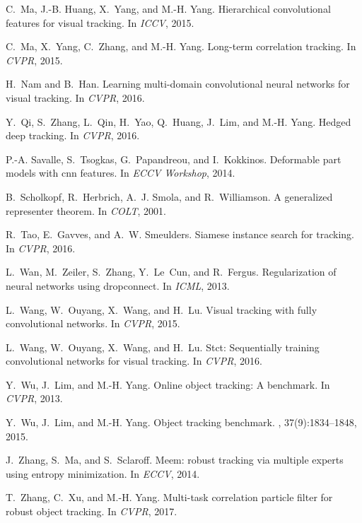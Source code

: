\documentclass[10pt,twocolumn,letterpaper]{article}
\begin{document}
{\begin{thebibliography}{10}
C.~Ma, J.-B. Huang, X.~Yang, and M.-H. Yang.
\newblock Hierarchical convolutional features for visual tracking.
\newblock In {\em ICCV}, 2015.

C.~Ma, X.~Yang, C.~Zhang, and M.-H. Yang.
\newblock Long-term correlation tracking.
\newblock In {\em CVPR}, 2015.

H.~Nam and B.~Han.
\newblock Learning multi-domain convolutional neural networks for visual
  tracking.
\newblock In {\em CVPR}, 2016.

Y.~Qi, S.~Zhang, L.~Qin, H.~Yao, Q.~Huang, J.~Lim, and M.-H. Yang.
\newblock Hedged deep tracking.
\newblock In {\em CVPR}, 2016.

P.-A. Savalle, S.~Tsogkas, G.~Papandreou, and I.~Kokkinos.
\newblock Deformable part models with cnn features.
\newblock In {\em ECCV Workshop}, 2014.

B.~Scholkopf, R.~Herbrich, A.~J. Smola, and R.~Williamson.
\newblock A generalized representer theorem.
\newblock In {\em COLT}, 2001.

R.~Tao, E.~Gavves, and A.~W. Smeulders.
\newblock Siamese instance search for tracking.
\newblock In {\em CVPR}, 2016.

L.~Wan, M.~Zeiler, S.~Zhang, Y.~Le~Cun, and R.~Fergus.
\newblock Regularization of neural networks using dropconnect.
\newblock In {\em ICML}, 2013.

L.~Wang, W.~Ouyang, X.~Wang, and H.~Lu.
\newblock Visual tracking with fully convolutional networks.
\newblock In {\em CVPR}, 2015.

L.~Wang, W.~Ouyang, X.~Wang, and H.~Lu.
\newblock Stct: Sequentially training convolutional networks for visual
  tracking.
\newblock In {\em CVPR}, 2016.

Y.~Wu, J.~Lim, and M.-H. Yang.
\newblock Online object tracking: A benchmark.
\newblock In {\em CVPR}, 2013.

Y.~Wu, J.~Lim, and M.-H. Yang.
\newblock Object tracking benchmark.
,
  37(9):1834--1848, 2015.

J.~Zhang, S.~Ma, and S.~Sclaroff.
\newblock Meem: robust tracking via multiple experts using entropy
  minimization.
\newblock In {\em ECCV}, 2014.

T.~Zhang, C.~Xu, and M.-H. Yang.
\newblock Multi-task correlation particle filter for robust object tracking.
\newblock In {\em CVPR}, 2017.

\end{thebibliography}
}
\end{document}
